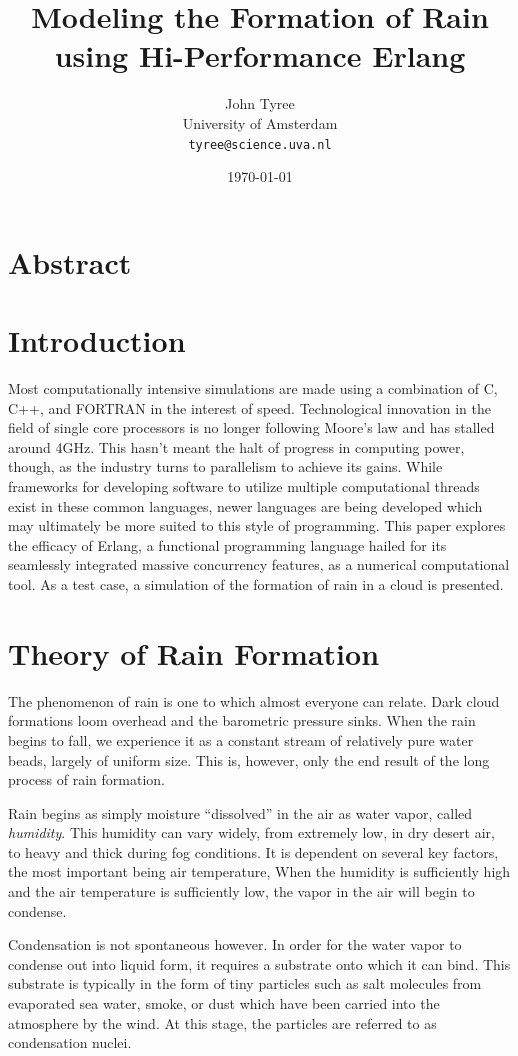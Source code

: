 \documentclass[twocolumn,a4paper,10pt]{article}
\title{Modeling the Formation of Rain using Hi-Performance Erlang}
\author{John Tyree\\
University of Amsterdam\\
\texttt{tyree@science.uva.nl}}
\date{\today}
\begin{document}
\maketitle
\section{Abstract}
\section{Introduction}
Most computationally intensive simulations are made using a combination of C,
C++, and FORTRAN in the interest of speed. Technological innovation in the field
of single core processors is no longer following Moore's law and has stalled
around 4GHz. This hasn't meant the halt of progress in computing power, though,
as the industry turns to parallelism to achieve its gains. While frameworks for
developing software to utilize multiple computational threads exist in these
common languages, newer languages are being developed which may ultimately be
more suited to this style of programming. This paper explores the efficacy of
Erlang, a functional programming language hailed for its seamlessly integrated
massive concurrency features, as a numerical computational tool. As a test case,
a simulation of the formation of rain in a cloud is presented.

\section{Theory of Rain Formation}

The phenomenon of rain is one to which almost everyone can relate. Dark cloud
formations loom overhead and the barometric pressure sinks. When the rain begins
to fall, we experience it as a constant stream of relatively pure water beads,
largely of uniform size. This is, however, only the end result of the long process of
rain formation.

Rain begins as simply moisture ``dissolved'' in the air as water vapor, called
\emph{humidity}.  This humidity can vary widely, from extremely low, in dry
desert air, to heavy and thick during fog conditions. It is dependent on several
key factors, the most important being air temperature, When the humidity is
sufficiently high and the air temperature is sufficiently low, the vapor in the
air will begin to condense.

Condensation is not spontaneous however. In order for the water vapor to
condense out into liquid form, it requires a substrate onto which it can bind.
This substrate is typically in the form of tiny particles such as salt
molecules from evaporated sea water, smoke, or dust which have been carried into
the atmosphere by the wind. At this stage, the particles are referred to as
condensation nuclei.
\end{document}
